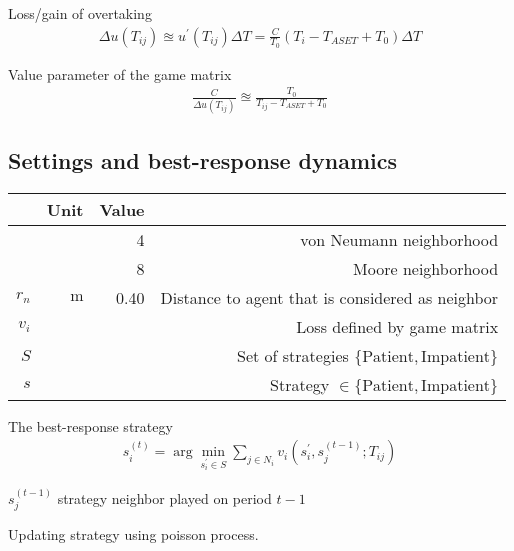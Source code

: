 Loss/gain of overtaking
\begin{align}
\Delta u(T_{ij}) \approxeq u^{\prime}(T_{ij}) \Delta T = \frac{C}{T_{0}} \left(T_{i} - T_{ASET} + T_{0}\right) \Delta T
\end{align}

Value parameter of the game matrix
\begin{align}
\frac{C}{\Delta u(T_{ij})} \approxeq \frac{T_{0}}{T_{ij} - T_{ASET} + T_{0}}
\end{align}

\subsection{Settings and best-response dynamics}
\begin{table}[H]
\begin{tabularx}{1.0\linewidth}{ r r r R }
 & Unit & Value &  \\
\hline
\hline
 & & 4 & von Neumann neighborhood \\
 & & 8 & Moore neighborhood \\
$ r_{n} $ & $ \mathrm{m} $ & 0.40 & Distance to agent that is considered as neighbor \\
$ v_{i} $ & & & Loss defined by game matrix \\
$ S $ &&& Set of strategies $ \{\mathrm{Patient}, \mathrm{Impatient}\} $ \\
$ s $ &&& Strategy $ \in \{\mathrm{Patient}, \mathrm{Impatient}\} $ \\
\end{tabularx}
\end{table}

The best-response strategy
\begin{align}
s_{i}^{(t)} = \arg\min_{s_{i}^{\prime}\in S} \sum_{j\in N_{i}} v_{i} \left(s_{i}^{\prime}, s_{j}^{(t-1)} ; T_{ij} \right)
\end{align}

$ s_{j}^{(t-1)} $ strategy neighbor played on period $ t-1 $

Updating strategy using poisson process.

